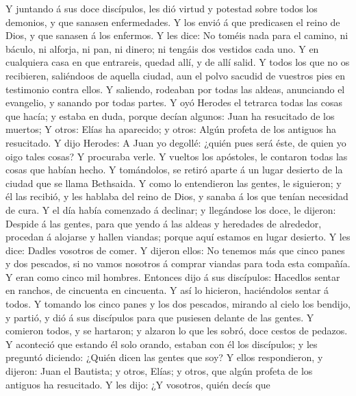  Y juntando á sus doce discípulos, les dió virtud y
potestad sobre todos los demonios, y que sanasen enfermedades.
 Y los envió á que predicasen el reino de Dios, y que
sanasen á los enfermos.  Y les dice: No toméis nada para
el camino, ni báculo, ni alforja, ni pan, ni dinero; ni tengáis dos
vestidos cada uno.  Y en cualquiera casa en que entrareis,
quedad allí, y de allí salid.  Y todos los que no os
recibieren, saliéndoos de aquella ciudad, aun el polvo sacudid de
vuestros pies en testimonio contra ellos.  Y saliendo,
rodeaban por todas las aldeas, anunciando el evangelio, y sanando por
todas partes.  Y oyó Herodes el tetrarca todas las cosas
que hacía; y estaba en duda, porque decían algunos: Juan ha resucitado
de los muertos;  Y otros: Elías ha aparecido; y otros:
Algún profeta de los antiguos ha resucitado.  Y dijo
Herodes: A Juan yo degollé: ¿quién pues será éste, de quien yo oigo
tales cosas? Y procuraba verle.  Y vueltos los apóstoles,
le contaron todas las cosas que habían hecho. Y tomándolos, se retiró
aparte á un lugar desierto de la ciudad que se llama Bethsaida.
 Y como lo entendieron las gentes, le siguieron; y él las
recibió, y les hablaba del reino de Dios, y sanaba á los que tenían
necesidad de cura.  Y el día había comenzado á declinar;
y llegándose los doce, le dijeron: Despide á las gentes, para que yendo
á las aldeas y heredades de alrededor, procedan á alojarse y hallen
viandas; porque aquí estamos en lugar desierto.  Y les
dice: Dadles vosotros de comer. Y dijeron ellos: No tenemos más que
cinco panes y dos pescados, si no vamos nosotros á comprar viandas para
toda esta compañía.  Y eran como cinco mil hombres.
Entonces dijo á sus discípulos: Hacedlos sentar en ranchos, de cincuenta
en cincuenta.  Y así lo hicieron, haciéndolos sentar á
todos.  Y tomando los cinco panes y los dos pescados,
mirando al cielo los bendijo, y partió, y dió á sus discípulos para que
pusiesen delante de las gentes.  Y comieron todos, y se
hartaron; y alzaron lo que les sobró, doce cestos de pedazos.
 Y aconteció que estando él solo orando, estaban con él
los discípulos; y les preguntó diciendo: ¿Quién dicen las gentes que
soy?  Y ellos respondieron, y dijeron: Juan el Bautista;
y otros, Elías; y otros, que algún profeta de los antiguos ha
resucitado.  Y les dijo: ¿Y vosotros, quién decís que
